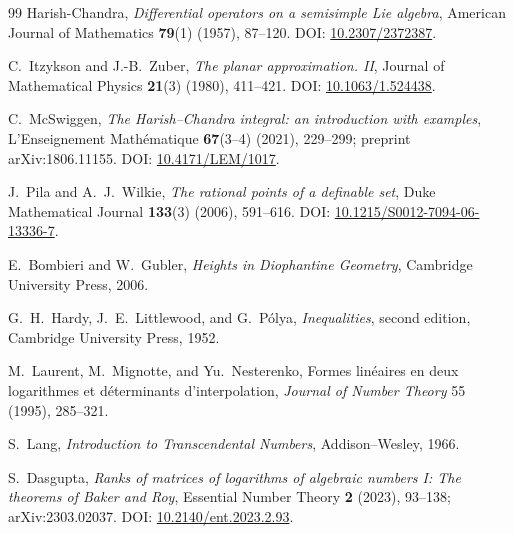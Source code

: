 \documentclass[11pt,oneside]{article}
\theoremstyle{definition}
\theoremstyle{remark}
\begin{document}
\begin{thebibliography}{99}
Harish-Chandra,
\newblock \emph{Differential operators on a semisimple Lie algebra},
\newblock American Journal of Mathematics \textbf{79}(1) (1957), 87--120.
\newblock DOI: \href{https://doi.org/10.2307/2372387}{10.2307/2372387}.

C.~Itzykson and J.-B.~Zuber,
\newblock \emph{The planar approximation. II},
\newblock Journal of Mathematical Physics \textbf{21}(3) (1980), 411--421.
\newblock DOI: \href{https://doi.org/10.1063/1.524438}{10.1063/1.524438}.

C.~McSwiggen,
\newblock \emph{The Harish--Chandra integral: an introduction with examples},
\newblock L'Enseignement Math\'ematique \textbf{67}(3--4) (2021), 229--299;
preprint arXiv:1806.11155.
\newblock DOI: \href{https://doi.org/10.4171/LEM/1017}{10.4171/LEM/1017}.

J.~Pila and A.~J.~Wilkie,
\newblock \emph{The rational points of a definable set},
\newblock Duke Mathematical Journal \textbf{133}(3) (2006), 591--616.
\newblock DOI: \href{https://doi.org/10.1215/S0012-7094-06-13336-7}{10.1215/S0012-7094-06-13336-7}.


E.~Bombieri and W.~Gubler,
\newblock \emph{Heights in Diophantine Geometry},
\newblock Cambridge University Press, 2006.

G.~H.~Hardy, J.~E.~Littlewood, and G.~P\'olya,
\newblock \emph{Inequalities}, second edition,
\newblock Cambridge University Press, 1952.

M.~Laurent, M.~Mignotte, and Yu.~Nesterenko,
\newblock Formes lin\'eaires en deux logarithmes et d\'eterminants
 d'interpolation,
\newblock \emph{Journal of Number Theory} 55 (1995), 285--321.

S.~Lang,
\newblock \emph{Introduction to Transcendental Numbers},
\newblock Addison--Wesley, 1966.




S.~Dasgupta,
\newblock \emph{Ranks of matrices of logarithms of algebraic numbers I: The theorems of
Baker and Roy},
\newblock Essential Number Theory \textbf{2} (2023), 93--138; arXiv:2303.02037.
\newblock DOI: \href{https://doi.org/10.2140/ent.2023.2.93}{10.2140/ent.2023.2.93}.


\end{thebibliography}
\end{document}
